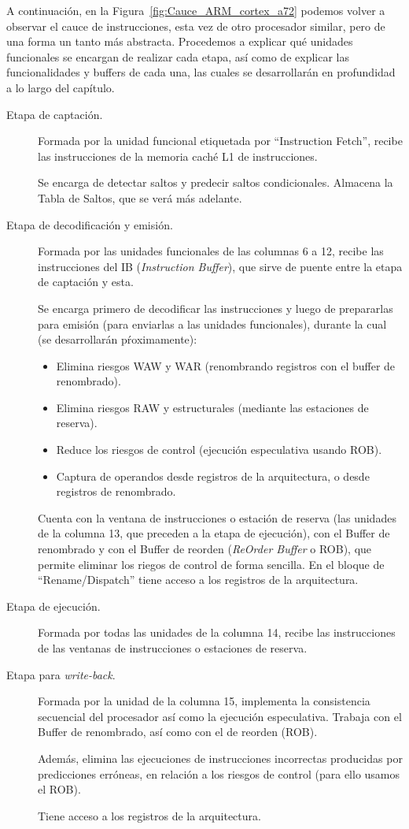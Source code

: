 A continuación, en la Figura~\ref{fig:Cauce_ARM_cortex_a72} podemos volver a observar el cauce de instrucciones, esta vez de otro procesador similar, pero de una forma un tanto más abstracta. Procedemos a explicar qué unidades funcionales se encargan de realizar cada etapa, así como de explicar las funcionalidades y buffers de cada una, las cuales se desarrollarán en profundidad a lo largo del capítulo.

\begin{description}
    \item [Etapa de captación.] Formada por la unidad funcional etiquetada por ``Instruction Fetch'', recibe las instrucciones de la memoria caché L1 de instrucciones.

        Se encarga de detectar saltos y predecir saltos condicionales. Almacena la Tabla de Saltos, que se verá más adelante.
    \item [Etapa de decodificación y emisión.] Formada por las unidades funcionales de las columnas 6 a 12, recibe las instrucciones del IB (\emph{Instruction Buffer}), que sirve de puente entre la etapa de captación y esta.

        Se encarga primero de decodificar las instrucciones y luego de prepararlas para emisión (para enviarlas a las unidades funcionales), durante la cual (se desarrollarán pŕoximamente):
        \begin{itemize}
            \item Elimina riesgos WAW y WAR (renombrando registros con el buffer de renombrado).
            \item Elimina riesgos RAW y estructurales (mediante las estaciones de reserva).
            \item Reduce los riesgos de control (ejecución especulativa usando ROB).
            \item Captura de operandos desde registros de la arquitectura, o desde registros de renombrado.
        \end{itemize}
        Cuenta con la ventana de instrucciones o estación de reserva (las unidades de la columna 13, que preceden a la etapa de ejecución), con el Buffer de renombrado y con el Buffer de reorden (\emph{ReOrder Buffer} o ROB), que permite eliminar los riegos de control de forma sencilla. En el bloque de ``Rename/Dispatch'' tiene acceso a los registros de la arquitectura.
    \item [Etapa de ejecución.] Formada por todas las unidades de la columna 14, recibe las instrucciones de las ventanas de instrucciones o estaciones de reserva.
    \item [Etapa para \emph{write-back}.] Formada por la unidad de la columna 15, implementa la consistencia secuencial del procesador así como la ejecución especulativa. Trabaja con el Buffer de renombrado, así como con el de reorden (ROB).

        Además, elimina las ejecuciones de instrucciones incorrectas producidas por predicciones erróneas, en relación a los riesgos de control (para ello usamos el ROB).

        Tiene acceso a los registros de la arquitectura.
\end{description}


